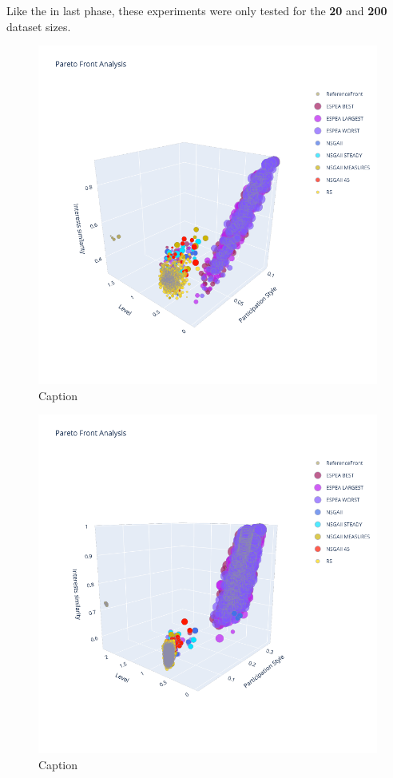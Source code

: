 Like the in last phase, these experiments were only tested for the \textbf{20} and \textbf{200} dataset sizes.

\begin{figure}
    \centering
    \includegraphics[width=\textwidth]{images/3d_smp_20.png}
    \caption{Caption}
    \label{fig:my_label}
\end{figure}

\begin{figure}
    \centering
    \includegraphics[width=\textwidth]{images/3d_smp_200.png}
    \caption{Caption}
    \label{fig:my_label}
\end{figure}


